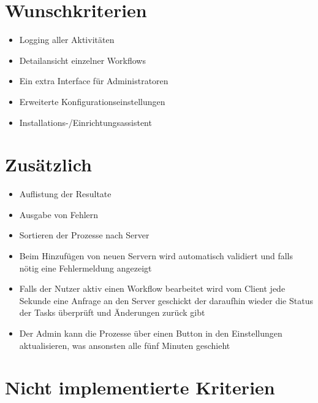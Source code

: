     \section{Wunschkriterien}
    
        \begin{itemize}
			\item Logging aller Aktivitäten
			\item Detailansicht einzelner Workflows
			\item Ein extra Interface für Administratoren
			\item Erweiterte Konfigurationseinstellungen
			\item Installations-/Einrichtungsassistent
		\end{itemize}
    
    \section{Zusätzlich}
    
        \begin{itemize}
            \item Auflistung der Resultate
            \item Ausgabe von Fehlern
            \item Sortieren der Prozesse nach Server
            \item Beim Hinzufügen von neuen Servern wird automatisch validiert und falls nötig eine Fehlermeldung angezeigt
            \item Falls der Nutzer aktiv einen Workflow bearbeitet wird vom Client jede Sekunde eine Anfrage an den Server geschickt der daraufhin wieder die Status der Tasks überprüft und Änderungen zurück gibt
            \item Der Admin kann die Prozesse über einen Button in den Einstellungen aktualisieren, was ansonsten alle fünf Minuten geschieht
        \end{itemize}


    \section{Nicht implementierte Kriterien}
        
